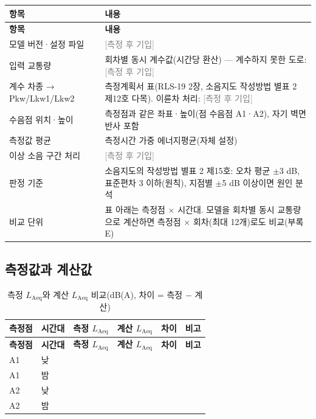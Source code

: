 \documentclass[10.5pt,a4paper]{article}
\newcommand{\Laeq}{\ensuremath{L_{\mathrm{Aeq}}}}
\newcommand{\TBD}{\textcolor{gray}{[측정 후 기입]}}
\newcommand{\hd}[1]{\cellcolor{headfill}\textbf{\sffamily #1}}
\newcommand{\ip}{\cellcolor{inp}}
\newcommand{\hr}[1]{\rule[-0.35\dimexpr#1\relax]{0pt}{#1}}
\begin{document}
\begin{longtable}{>{\raggedright\arraybackslash}p{}>{\raggedright\arraybackslash}p{}}
\toprule
\hd{항목} & \hd{내용} \\ \midrule
\endfirsthead
\toprule
\hd{항목} & \hd{내용} \\ \midrule
\endhead
\bottomrule
\endlastfoot
모델 버전·설정 파일 & \ip{}\TBD \\ \midrule
입력 교통량 & \ip{}회차별 동시 계수값(시간당 환산) --- 계수하지 못한 도로: \TBD \\ \midrule
계수 차종 → Pkw/Lkw1/Lkw2 & \ip{}측정계획서 표(RLS-19 2장, 소음지도 작성방법 별표 2 제12호 다목). 이륜차 처리: \TBD \\ \midrule
수음점 위치·높이 & 측정점과 같은 좌표·높이(점 수음점 A1·A2), 자기 벽면 반사 포함 \\ \midrule
측정값 평균 & 측정시간 가중 에너지평균(자체 설정) \\ \midrule
이상 소음 구간 처리 & \ip{}\TBD \\ \midrule
판정 기준 & 소음지도의 작성방법 별표 2 제15호: 오차 평균 $\pm$3 dB, 표준편차 3 이하(원칙), 지점별 $\pm$5 dB 이상이면 원인 분석 \\ \midrule
비교 단위 & 표 아래는 측정점 $\times$ 시간대. 모델을 회차별 동시 교통량으로 계산하면 측정점 $\times$ 회차(최대 12개)로도 비교(부록 E) \\
\end{longtable}
\addtocounter{table}{-1}
\normalsize
{}\subsection{측정값과 계산값}
\small
\begin{longtable}{>{\centering\arraybackslash}p{}>{\centering\arraybackslash}p{}>{\centering\arraybackslash}p{}>{\centering\arraybackslash}p{}>{\centering\arraybackslash}p{}>{\raggedright\arraybackslash}p{}}
\caption{측정 \Laeq{}와 계산 \Laeq{} 비교(dB(A), 차이 = 측정 $-$ 계산)}\\
\toprule
\hd{측정점} & \hd{시간대} & \hd{측정 \Laeq} & \hd{계산 \Laeq} & \hd{차이} & \hd{비고} \\ \midrule
\endfirsthead
\toprule
\hd{측정점} & \hd{시간대} & \hd{측정 \Laeq} & \hd{계산 \Laeq} & \hd{차이} & \hd{비고} \\ \midrule
\endhead
\bottomrule
\endlastfoot
\hr{8mm}A1 & 낮 & \ip{} & \ip{} & \ip{} & \ip{} \\ \midrule
\hr{8mm}A1 & 밤 & \ip{} & \ip{} & \ip{} & \ip{} \\ \midrule
\hr{8mm}A2 & 낮 & \ip{} & \ip{} & \ip{} & \ip{} \\ \midrule
\hr{8mm}A2 & 밤 & \ip{} & \ip{} & \ip{} & \ip{} \\
\end{longtable}
\end{document}
